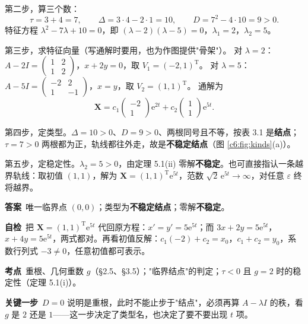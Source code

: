 \documentclass[11pt]{ctexart}
\renewcommand{\qbreak}{\needspace{0.26\textheight}}
\newcommand{\qpagebreak}{\needspace{0.92\textheight}}
\newcommand{\X}{\mathbf{X}}\newcommand{\Y}{\mathbf{Y}}
\newcommand{\eps}{\varepsilon}
\begin{document}
第二步，算三个数：
\[
\tau=3+4=7,\qquad \Delta=3\cdot4-2\cdot1=10,\qquad D=7^{2}-4\cdot10=9>0 .
\]
特征方程 $\lambda^{2}-7\lambda+10=0$，即 $(\lambda-2)(\lambda-5)=0$，$\lambda_1=2$，$\lambda_2=5$。

第三步，求特征向量（写通解时要用，也为作图提供"骨架"）。
对 $\lambda=2$：$A-2I=\begin{pmatrix}1&2\\1&2\end{pmatrix}$，$x+2y=0$，取 $V_1=(-2,1)^{\mathrm T}$。
对 $\lambda=5$：$A-5I=\begin{pmatrix}-2&2\\1&-1\end{pmatrix}$，$x=y$，取 $V_2=(1,1)^{\mathrm T}$。
通解为
\[
\X=c_1\begin{pmatrix}-2\\1\end{pmatrix}\mathrm{e}^{2t}+c_2\begin{pmatrix}1\\1\end{pmatrix}\mathrm{e}^{5t}.
\]

第四步，定类型。$\Delta=10>0$、$D=9>0$、两根同号且不等，按表 3.1 是\textbf{结点}；$\tau=7>0$ 两根都为正，轨线都往外走，故是\textbf{不稳定结点}（图 \ref{c6:fig:kinds}(a)）。

第五步，定稳定性。$\lambda_2=5>0$，由定理 5.1(ii) 零解\textbf{不稳定}。也可直接指认一条越界轨线：取初值 $(1,1)$，解为 $\X=(1,1)^{\mathrm T}\mathrm{e}^{5t}$，范数 $\sqrt2\,\mathrm{e}^{5t}\to\infty$，对任意 $\eps$ 终将越界。

\textbf{答案}\ 唯一临界点 $(0,0)$；类型为\textbf{不稳定结点}；零解\textbf{不稳定}。

\textbf{自检}\ 把 $\X=(1,1)^{\mathrm T}\mathrm{e}^{5t}$ 代回原方程：$x'=y'=5\mathrm{e}^{5t}$；而 $3x+2y=5\mathrm{e}^{5t}$，$x+4y=5\mathrm{e}^{5t}$，两式都对。再看初值反解：$c_1(-2)+c_2=x_0$，$c_1+c_2=y_0$，系数行列式 $-3\neq0$，任意初值都可表示。

\qpagebreak
\qbreak
{}
\label{c6:app:a2}

\textbf{考点}\ 重根、几何重数 $g$（§2.5、§3.5）；"临界结点"的判定；$\tau<0$ 且 $g=2$ 时的稳定性（定理 5.1(i)）。

\textbf{关键一步}\ $D=0$ 说明是重根，此时不能止步于"结点"，必须再算 $A-\lambda I$ 的秩，看 $g$ 是 $2$ 还是 $1$——这一步决定了类型名，也决定了要不要出现 $t$ 项。
\end{document}
